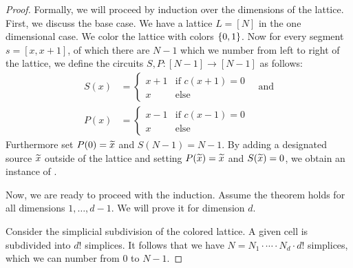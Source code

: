 \begin{proof}
	Formally, we will proceed by induction over the dimensions of the lattice. First, we discuss the base case. We have a lattice $L = [N]$ in the one dimensional case. We color the lattice with colors $\left\{0, 1\right\}$. Now for every segment $s = [x, x+1]$, of which there are $N-1$ which we number from left to right of the lattice, we define the circuits $S, P : [N-1] \rightarrow [N-1]$ as follows:
	\begin{align*}
		S(x) & = \begin{cases}
			         x + 1 & \text{if $c(x+1) = 0$} \\
			         x     & \text{else}
		         \end{cases} \quad \text{and} \\
		P(x) & = \begin{cases}
			         x - 1 & \text{if $c(x-1) = 0$} \\
			         x     & \text{else}
		         \end{cases}
	\end{align*}
	Furthermore set $P(0) = \widetilde{x}$ and $S(N-1) = N-1$. By adding a designated source $\widetilde{x}$ outside of the lattice and setting $P(\widetilde{x}) = \widetilde{x}$ and $S(\widetilde{x}) = 0$, we obtain an instance of \EndOfLine.

	Now, we are ready to proceed with the induction. Assume the theorem holds for all dimensions $1, \dots, d-1$. We will prove it for dimension $d$.

	Consider the simplicial subdivision of the colored lattice. A given cell is subdivided into $d!$ simplices. It follows that we have $N = N_1 \cdot \cdots \cdot N_d \cdot d!$ simplices, which we can number from $0$ to $N-1$.


\end{proof}
